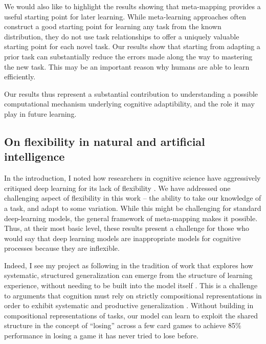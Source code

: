 We would also like to highlight the results showing that meta-mapping provides a useful starting point for later learning. While meta-learning approaches often construct a good starting point for learning any task from the known distribution, they do not use task relationships to offer a uniquely valuable starting point for each novel task. Our results show that starting from adapting a prior task can substantially reduce the errors made along the way to mastering the new task. This may be an important reason why humans are able to learn efficiently. \par 

Our results thus represent a substantial contribution to understanding a possible computational mechanism underlying cognitive adaptibility, and the role it may play in future learning. 

\subsection{On flexibility in natural and artificial intelligence}

In the introduction, I noted how researchers in cognitive science have aggressively critiqued deep learning for its lack of flexibility \citep[e.g.][]{Lake2015, Lake2016, Lake2017, Marcus2018}. We have addressed one challenging aspect of flexibility in this work -- the ability to take our knowledge of a task, and adapt to some variation. While this might be challenging for standard deep-learning models, the general framework of meta-mapping makes it possible. Thus, at their most basic level, these results present a challenge for those who would say that deep learning models are inappropriate models for cognitive processes because they are inflexible. \par  

Indeed, I see my project as following in the tradition of work that explores how systematic, structured generalization can emerge from the structure of learning experience, without needing to be built into the model itself \citep{McClelland2010a, McClelland2010, Hansen2017}. This is a challenge to arguments that cognition must rely on strictly compositional representations in order to exhibit systematic and productive generalization \citep[e.g.][]{Fodor2001, Fodor2008lot2, Lake2017}. Without building in compositional representations of tasks, our model can learn to exploit the shared structure in the concept of ``losing'' across a few card games to achieve 85\% performance in losing a game it has never tried to lose before. \par 

